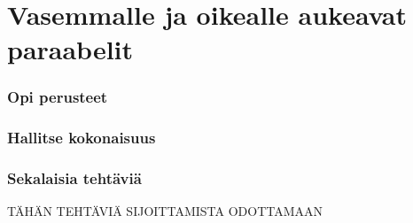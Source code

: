 \section{Vasemmalle ja oikealle aukeavat paraabelit}


\begin{tehtavasivu}

\subsubsection*{Opi perusteet}

\subsubsection*{Hallitse kokonaisuus}

\subsubsection*{Sekalaisia tehtäviä}

TÄHÄN TEHTÄVIÄ SIJOITTAMISTA ODOTTAMAAN

\end{tehtavasivu}
